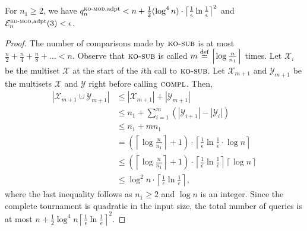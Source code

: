 \documentclass[twoside,11pt]{article}
\newcommand{\df}[1][\rm{def}]{\stackrel{#1}{=}}
\newcommand{\cY}{\mathcal{Y}}
\newcommand{\cX}{\mathcal{X}}
\newcommand{\cE}{\mathcal{E}}
\newcommand{\algorithms}[1]{\textsc{#1}}
\newcommand{\algcomp}{\algorithms{compl}}
\newcommand{\algkosub}{\algorithms{ko-sub}}
\newcommand{\algkomod}{\algorithms{ko-mod}}
\newcommand{\pe}{\cE}
\newcommand{\adaptive}{\textnormal{adpt}}
\newcommand{\errorcomb}{\epsilon}
\begin{document}
\begin{theorem}
\label{thm:knockout}
For $n_1\ge 2$, we have $q_n^{\algkomod,\adaptive}<n+\frac12 (\log^4 n)\cdot \left\lceil\frac1\errorcomb\ln \frac1\errorcomb \right\rceil^2$ and $\pe_n^{\algkomod,\adaptive}(3)<\errorcomb$.
\end{theorem}
\begin{proof}
The number of comparisons made by $\algkosub$ is at most
$\frac{n}{2}+\frac{n}{4}+\frac{n}{8}+\ldots<n$. Observe that 
$\algkosub$ is called $m\df\left\lceil\log \frac{n}{n_1}\right\rceil$ times. 
Let $\cX_i$ be the multiset $\cX$ at the start of the $i$th call to $\algkosub$.
Let $\cX_{m+1}$ and $\cY_{m+1}$ be the multisets $\cX$ and $\cY$ right
before calling $\algcomp$. Then, 
\begin{align*}
|\cX_{m+1}\cup\cY_{m+1}|&\le |\cX_{m+1}|+|\cY_{m+1}|\\
&\le n_1+ \sum_{i=1}^{m} \left(|\cY_{i+1}|-|\cY_{i}|\right)\\
&\le n_1+mn_1\\
&= \left(\left\lceil\log \frac{n}{n_1}\right\rceil+1\right) \cdot\left\lceil\frac1\errorcomb\ln \frac1\errorcomb \cdot \log n \right\rceil\\
&\le \left(\left\lceil\log \frac{n}{n_1}\right\rceil+1\right)\cdot \left\lceil\frac1\errorcomb\ln \frac1\errorcomb \right\rceil  \left\lceil\log n\right\rceil\\
&\le \log^2 n\cdot \left\lceil\frac1\errorcomb\ln \frac1\errorcomb \right\rceil,
\end{align*}
where the last inequality follows as $n_1\ge 2$ and $\log n$ is
an integer.  Since the complete tournament is quadratic in the
  input size, the total number of queries is at most $n+\frac12 \log^4
  n \left\lceil\frac1\errorcomb\ln \frac1\errorcomb \right\rceil^2$.
 

\end{proof}
\end{document}
